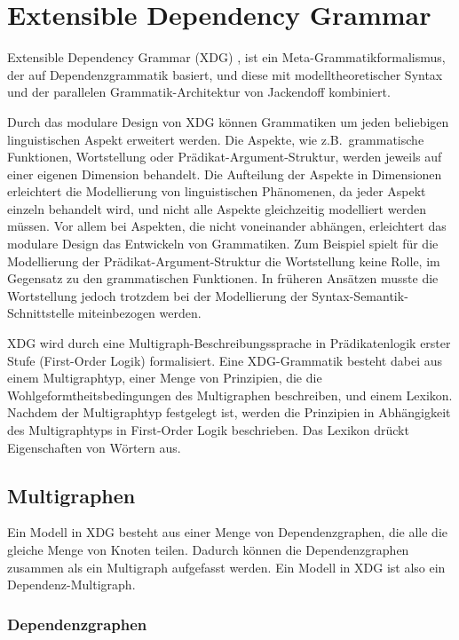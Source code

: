 \chapter{Extensible Dependency Grammar}\label{XDG}

Extensible Dependency Grammar (XDG) \cite{DebusmannEtal04SS},
\cite{Debusmann06} ist ein Meta-Grammatikformalismus, der auf
Dependenzgrammatik \cite{Tesniere59} basiert, und diese mit
modelltheoretischer Syntax und der parallelen Gram\-matik-Architektur
von Jackendoff \cite{Jackendoff02} kombiniert.

Durch das modulare Design von XDG k\"onnen Grammatiken um jeden
beliebigen linguistischen Aspekt erweitert werden. Die Aspekte, wie
z.B.\ grammatische Funktionen, Wortstellung oder
Pr\"adikat-Argument-Struktur, werden jeweils auf einer eigenen
Dimension behandelt. Die Aufteilung der Aspekte in Dimensionen
erleichtert die Modellierung von linguistischen Ph\"anomenen, da jeder
Aspekt einzeln behandelt wird, und nicht alle Aspekte gleichzeitig
modelliert werden m\"ussen.  Vor allem bei Aspekten, die nicht
voneinander abh\"angen, erleichtert das modulare Design das Entwickeln
von Grammatiken. Zum Beispiel spielt f\"ur die Modellierung der
Pr\"adikat-Argument-Struktur die Wortstellung keine Rolle, im
Gegensatz zu den grammatischen Funktionen. In fr\"uheren Ans\"atzen
musste die Wortstellung jedoch trotzdem bei der Modellierung der
Syntax-Semantik-Schnittstelle miteinbezogen werden.

XDG wird durch eine Multigraph-Beschreibungssprache in
Pr{\"a}dikatenlogik erster Stufe (First-Order Logik)
formalisiert. Eine XDG-Grammatik besteht dabei aus einem
Multigraphtyp, einer Menge von Prinzipien, die die
Wohlgeformtheitsbedingungen des Multigraphen beschreiben, und einem
Lexikon. Nachdem der Multigraphtyp festgelegt ist, werden die
Prinzipien in Abh\"angigkeit des Multigraphtyps in First-Order Logik
beschrieben. Das Lexikon dr\"uckt Eigenschaften von W\"ortern aus.

\section{Multigraphen}

Ein Modell in XDG besteht aus einer Menge von Dependenzgraphen, die
alle die gleiche Menge von Knoten teilen. Dadurch k\"onnen die
Dependenzgraphen zusammen als ein Multigraph aufgefasst werden. Ein
Modell in XDG ist also ein Dependenz-Multigraph.

\subsection{Dependenzgraphen}

